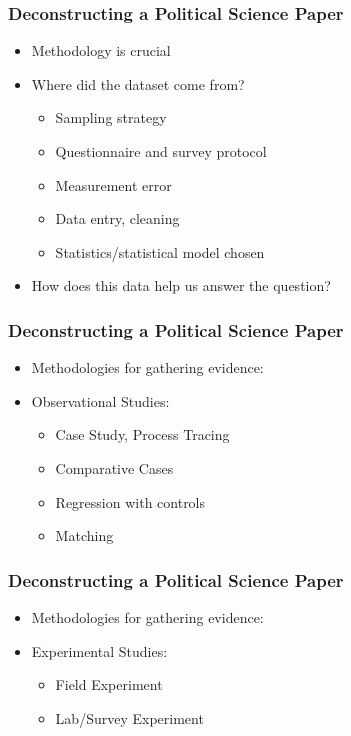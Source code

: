 \documentclass[xcolor=x11names,compress]{beamer}\usepackage[]{graphicx}\usepackage[]{color}
\renewcommand{\(}{\begin{columns}}
\renewcommand{\)}{\end{columns}}
\newcommand{\<}[1]{\begin{column}{#1}}
\renewcommand{\>}{\end{column}}
\begin{document}
\begin{frame}
\frametitle{Deconstructing a Political Science Paper}
\begin{itemize}
\item Methodology is crucial
\item Where did the dataset come from?
\begin{itemize}
\item Sampling strategy
\item Questionnaire and survey protocol
\item Measurement error
\item Data entry, cleaning
\item Statistics/statistical model chosen
\end{itemize}
\item How does this data help us answer the question?
\end{itemize}
\end{frame}

\begin{frame}
\frametitle{Deconstructing a Political Science Paper}
\begin{itemize}
\item Methodologies for gathering evidence:
\item Observational Studies:
\begin{itemize}
\item Case Study, Process Tracing
\item Comparative Cases
\item Regression with controls
\item Matching
\end{itemize}
\end{itemize}
\end{frame}

\begin{frame}
\frametitle{Deconstructing a Political Science Paper}
\begin{itemize}
\item Methodologies for gathering evidence:
\item Experimental Studies:
\begin{itemize}
\item Field Experiment
\item Lab/Survey Experiment
\end{itemize}
\end{itemize}
\end{frame}
\end{document}
